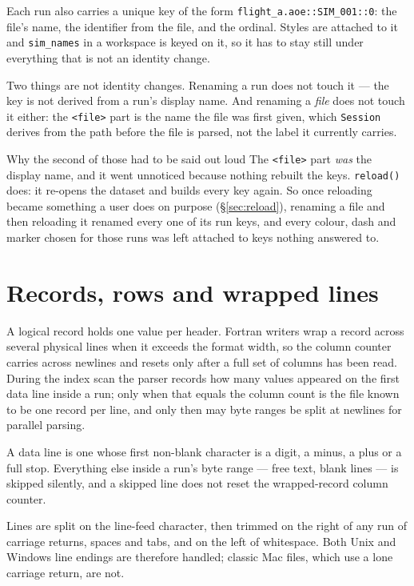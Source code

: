\documentclass[11pt,a4paper,oneside]{report}
\newcommand{\code}[1]{\texttt{#1}}
\begin{document}
Each run also carries a unique key of the form
\code{flight\_a.aoe::SIM\_001::0}: the file's name, the identifier from the
file, and the ordinal. Styles are attached to it and \code{sim\_names} in a
workspace is keyed on it, so it has to stay still under everything that is not
an identity change.

Two things are not identity changes. Renaming a run does not touch it --- the
key is not derived from a run's display name. And renaming a \emph{file} does
not touch it either: the \code{<file>} part is the name the file was first
given, which \code{Session} derives from the path before the file is parsed,
not the label it currently carries.

\begin{aoenote}{Why the second of those had to be said out loud}
The \code{<file>} part \emph{was} the display name, and it went unnoticed
because nothing rebuilt the keys. \code{reload()} does: it re-opens the dataset
and builds every key again. So once reloading became something a user does on
purpose (\S\ref{sec:reload}), renaming a file and then reloading it renamed
every one of its run keys, and every colour, dash and marker chosen for those
runs was left attached to keys nothing answered to.
\end{aoenote}

\section{Records, rows and wrapped lines}

A logical record holds one value per header. Fortran writers wrap a record across
several physical lines when it exceeds the format width, so the column counter
carries across newlines and resets only after a full set of columns has been
read. During the index scan the parser records how many values appeared on the
first data line inside a run; only when that equals the column count is the file
known to be one record per line, and only then may byte ranges be split at
newlines for parallel parsing.

A data line is one whose first non-blank character is a digit, a minus, a plus or
a full stop. Everything else inside a run's byte range --- free text, blank lines
--- is skipped silently, and a skipped line does not reset the wrapped-record
column counter.

Lines are split on the line-feed character, then trimmed on the right of any run
of carriage returns, spaces and tabs, and on the left of whitespace. Both Unix
and Windows line endings are therefore handled; classic Mac files, which use a
lone carriage return, are not.
\end{document}
